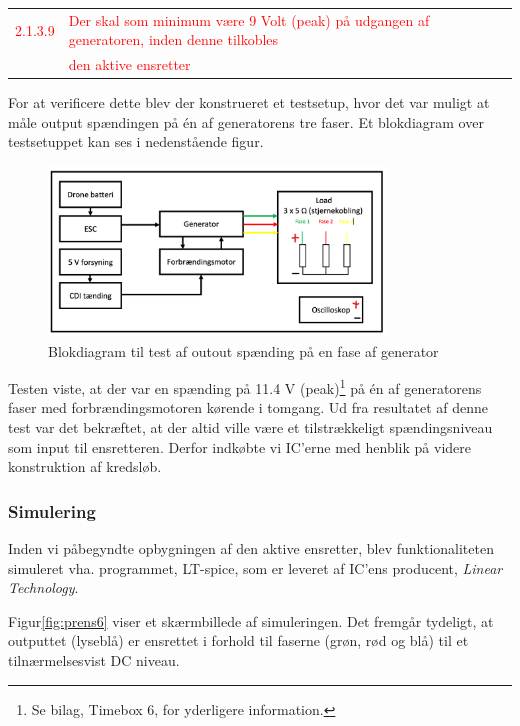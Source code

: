 \begin{tabular}{p{1cm}l}
  \textcolor{red}{2.1.3.9}&\textcolor{red}{Der skal som minimum være 9 Volt (peak) på udgangen af generatoren, inden denne tilkobles}\\
  & \textcolor{red}{den aktive ensretter}\\
\end{tabular}

For at verificere dette blev der konstrueret et testsetup, hvor det var muligt at måle output spændingen på én af generatorens tre faser. Et blokdiagram over testsetuppet kan ses i nedenstående figur.

\begin{figure}[h]
  \centering
  \includegraphics[width=0.8\textwidth]{prens5.png}
  \caption{Blokdiagram til test af outout spænding på en fase af generator}
  \label{fig:prens5}
\end{figure}

Testen viste, at der var en spænding på 11.4 V (peak)\footnote{Se bilag, Timebox 6, for yderligere information.} på én af generatorens faser med forbrændingsmotoren kørende i tomgang. Ud fra resultatet af denne test var det bekræftet, at der altid ville være et tilstrækkeligt spændingsniveau som input til ensretteren. Derfor indkøbte vi IC’erne med henblik på videre konstruktion af kredsløb.

\subsubsection{Simulering}
\label{sec:simulering}

Inden vi påbegyndte opbygningen af den aktive ensretter, blev funktionaliteten simuleret vha. programmet, LT-spice, som er leveret af IC’ens producent, \textit{Linear Technology}.

Figur\ref{fig:prens6} viser et skærmbillede af simuleringen. Det fremgår tydeligt, at outputtet (lyseblå) er ensrettet i forhold til faserne (grøn, rød og blå) til et tilnærmelsesvist DC niveau. 

